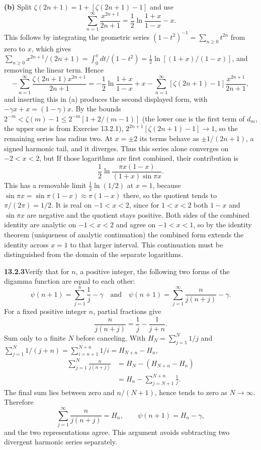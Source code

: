\textbf{(b)} Split $\zeta(2n+1)=1+[\zeta(2n+1)-1]$ and use
\[
\sum_{n=1}^{\infty}\frac{x^{2n+1}}{2n+1}
=\frac12\ln\frac{1+x}{1-x}-x.
\]
This follows by integrating the geometric series
$(1-t^2)^{-1}=\sum_{n\ge0}t^{2n}$ from zero to $x$, which gives
$\sum_{n\ge0}x^{2n+1}/(2n+1)=\int_0^xdt/(1-t^2)
=\frac12\ln[(1+x)/(1-x)]$, and removing the linear term.  Hence
\[
-\sum_{n=1}^{\infty}\frac{\zeta(2n+1)x^{2n+1}}{2n+1}
=-\frac12\ln\frac{1+x}{1-x}+x
-\sum_{n=1}^{\infty}\left[\zeta(2n+1)-1\right]\frac{x^{2n+1}}{2n+1},
\]
and inserting this in (a) produces the second displayed form, with
$-\gamma x+x=(1-\gamma)x$.
By the bounds $2^{-m}<\zeta(m)-1\le2^{-m}[1+2/(m-1)]$ (the lower one
is the first term of $d_m$, the upper one is from Exercise 13.2.1),
$2^{2n+1}[\zeta(2n+1)-1]\to1$, so the remaining
series has radius two.  At $x=\pm2$ its terms behave as
$\pm1/(2n+1)$, a signed harmonic tail, and it diverges.  Thus this
series alone converges on $\boxed{-2<x<2}$, but 
If those logarithms are first combined, their contribution is
\[
\frac12\ln\frac{\pi x(1-x)}{(1+x)\sin\pi x}.
\]
This has a removable limit $\tfrac12\ln(1/2)$ at $x=1$, because
$\sin\pi x=\sin\pi(1-x)\approx\pi(1-x)$ there, so the quotient tends
to $\pi/(2\pi)=1/2$.  It is real on $-1<x<2$, since for $1<x<2$ both
$1-x$ and $\sin\pi x$ are negative and the quotient stays positive.
Both sides of the combined identity are analytic on $-1<x<2$ and
agree on $-1<x<1$, so by the identity theorem (uniqueness of
analytic continuation) the combined form extends the identity across
$x=1$ to that larger interval.  This continuation
must be distinguished from the domain of the separate logarithms.


\par\bigskip
\noindent\textbf{13.2.3}\quad Verify that for $n$, a positive integer, the
following two forms of the digamma function are equal to each other:
\[
\psi(n+1)=\sum_{j=1}^{n}\frac{1}{j}-\gamma
\quad\text{and}\quad
\psi(n+1)=\sum_{j=1}^{\infty}\frac{n}{j(n+j)}-\gamma.
\]
\solution
For a fixed positive integer $n$, partial fractions give
\[
\frac{n}{j(n+j)}=\frac1j-\frac1{j+n}.
\]
Sum only to a finite $N$ before canceling.  With
$H_N=\sum_{j=1}^N1/j$ and
$\sum_{j=1}^N1/(j+n)=\sum_{i=n+1}^{N+n}1/i=H_{N+n}-H_n$,
\begin{align*}
\sum_{j=1}^N\frac{n}{j(n+j)}
&=H_N-(H_{N+n}-H_n)\\
&=H_n-\sum_{j=N+1}^{N+n}\frac1j.
\end{align*}
The final sum lies between zero and $n/(N+1)$, hence tends to
zero as $N\to\infty$.  Therefore
\[
\boxed{\sum_{j=1}^{\infty}\frac{n}{j(n+j)}=H_n},
\qquad\psi(n+1)=H_n-\gamma,
\]
and the two representations agree.  This argument avoids
subtracting two divergent harmonic series separately.


